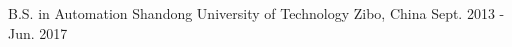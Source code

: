 \begin{cventries}
  \cventry
    {B.S. in Automation} %
    {Shandong University of Technology} %
    {Zibo, China} %
    {Sept. 2013 - Jun. 2017} %
    {
    }

\end{cventries}
